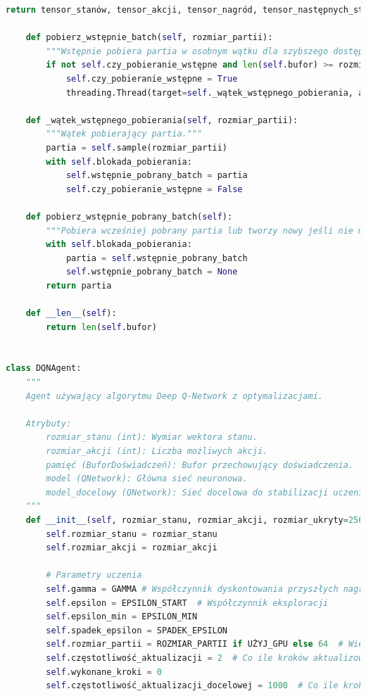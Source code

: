 \documentclass[a4paper,12pt]{article}
\begin{document}
\begin{lstlisting}[language=Python]
        return tensor_stanów, tensor_akcji, tensor_nagród, tensor_następnych_stanów, tensor_zakończonych
    
    def pobierz_wstępnie_batch(self, rozmiar_partii):
        """Wstępnie pobiera partia w osobnym wątku dla szybszego dostępu."""
        if not self.czy_pobieranie_wstępne and len(self.bufor) >= rozmiar_partii:
            self.czy_pobieranie_wstępne = True
            threading.Thread(target=self._wątek_wstępnego_pobierania, args=(rozmiar_partii,)).start()
    
    def _wątek_wstępnego_pobierania(self, rozmiar_partii):
        """Wątek pobierający partia."""
        partia = self.sample(rozmiar_partii)
        with self.blokada_pobierania:
            self.wstępnie_pobrany_batch = partia
            self.czy_pobieranie_wstępne = False
    
    def pobierz_wstępnie_pobrany_batch(self):
        """Pobiera wcześniej pobrany partia lub tworzy nowy jeśli nie ma."""
        with self.blokada_pobierania:
            partia = self.wstępnie_pobrany_batch
            self.wstępnie_pobrany_batch = None
        return partia
    
    def __len__(self):
        return len(self.bufor)


class DQNAgent:
    """
    Agent używający algorytmu Deep Q-Network z optymalizacjami.
    
    Atrybuty:
        rozmiar_stanu (int): Wymiar wektora stanu.
        rozmiar_akcji (int): Liczba możliwych akcji.
        pamięć (BuforDoświadczeń): Bufor przechowujący doświadczenia.
        model (QNetwork): Główna sieć neuronowa.
        model_docelowy (QNetwork): Sieć docelowa do stabilizacji uczenia.
    """
    def __init__(self, rozmiar_stanu, rozmiar_akcji, rozmiar_ukryty=256, współczynnik_uczenia=0.0003):
        self.rozmiar_stanu = rozmiar_stanu
        self.rozmiar_akcji = rozmiar_akcji
        
        # Parametry uczenia
        self.gamma = GAMMA # Współczynnik dyskontowania przyszłych nagród
        self.epsilon = EPSILON_START  # Współczynnik eksploracji
        self.epsilon_min = EPSILON_MIN
        self.spadek_epsilon = SPADEK_EPSILON
        self.rozmiar_partii = ROZMIAR_PARTII if UŻYJ_GPU else 64  # Większy partia na GPU, mniejszy na CPU
        self.częstotliwość_aktualizacji = 2  # Co ile kroków aktualizować model
        self.wykonane_kroki = 0
        self.częstotliwość_aktualizacji_docelowej = 1000  # Co ile kroków aktualizować model docelowy
        

\end{lstlisting}
\end{document}
